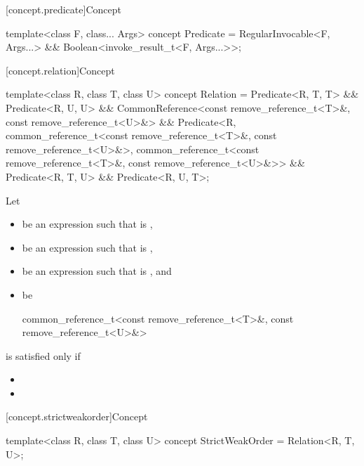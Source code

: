 [concept.predicate]{Concept }

%
\begin{itemdecl}
template<class F, class... Args>
  concept Predicate = RegularInvocable<F, Args...> && Boolean<invoke_result_t<F, Args...>>;
\end{itemdecl}

[concept.relation]{Concept }

%
\begin{itemdecl}
template<class R, class T, class U>
  concept Relation =
    Predicate<R, T, T> && Predicate<R, U, U> &&
    CommonReference<const remove_reference_t<T>&, const remove_reference_t<U>&> &&
    Predicate<R,
      common_reference_t<const remove_reference_t<T>&, const remove_reference_t<U>&>,
      common_reference_t<const remove_reference_t<T>&, const remove_reference_t<U>&>> &&
    Predicate<R, T, U> && Predicate<R, U, T>;
\end{itemdecl}

\begin{itemdescr}
\pnum
Let
\begin{itemize}
\item {} be an expression such that  is ,
\item {} be an expression such that  is ,
\item {} be an expression such that  is ,
  and
\item {} be
  \begin{codeblock}
  common_reference_t<const remove_reference_t<T>&,
                     const remove_reference_t<U>&>
  \end{codeblock}
\end{itemize}
 is satisfied only if

\begin{itemize}
\item {}
\item {}
\end{itemize}
\end{itemdescr}

[concept.strictweakorder]{Concept }

%
\begin{itemdecl}
template<class R, class T, class U>
  concept StrictWeakOrder = Relation<R, T, U>;
\end{itemdecl}

